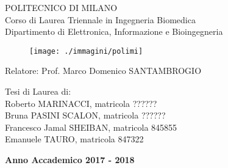 \documentclass[/../main.tex]{subfiles}
\begin{document}
\thispagestyle{empty}
\vspace*{-2.5cm} %
\vspace*{0.5cm}

\begin{center}
\large
POLITECNICO DI MILANO\\
\normalsize
Corso di Laurea Triennale in Ingegneria Biomedica\\
Dipartimento di Elettronica, Informazione e Bioingegneria

\vspace*{1cm}
\begin{figure}[htbp]
\begin{center}
\texttt{[image: ./immagini/polimi]}
\end{center}
\end{figure}
\vspace*{0.7cm}

\LARGE
{}

\end{center}

\vspace*{1cm} 

\begin{flushleft}
Relatore: Prof. Marco Domenico SANTAMBROGIO\\
\end{flushleft}

\begin{flushright}
Tesi di Laurea di:\\
Roberto MARINACCI, matricola ?????? \\
Bruna PASINI SCALON, matricola ?????? \\
Francesco Jamal SHEIBAN, matricola 845855 \\
Emanuele TAURO, matricola 847322 \\

\end{flushright}



\vspace*{1.0cm}

\begin{center}
\textbf{Anno Accademico 2017 - 2018}
\end{center}

\restoregeometry
\end{document}
